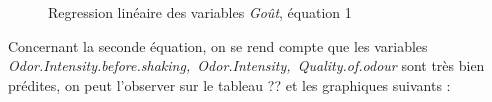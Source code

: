\documentclass[a4paper,french,10pt]{article}
\begin{document}
\begin{figure}[htp]
{	}%
	\hfill%
	\caption{Regression linéaire des variables \textit{Goût}, équation 1}
\end{figure}

Concernant la seconde équation, on se rend compte que les variables \textit{Odor.Intensity.before.shaking,~Odor.Intensity,~Quality.of.odour} sont très bien prédites, on peut l'observer sur le tableau ?? et les graphiques suivants : 
\end{document}
